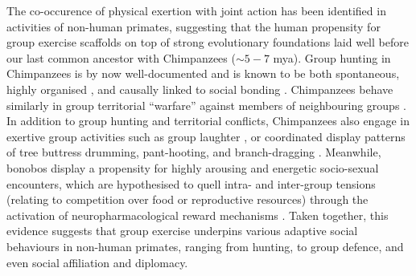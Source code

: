 \begin{CJK}{UTF8}{gbsn}
The co-occurence of physical exertion with joint action has been identified in activities of non-human primates, suggesting that the human propensity for group exercise scaffolds on top of strong evolutionary foundations laid well before our last common ancestor with Chimpanzees ($\sim 5-7$ mya).  Group hunting in Chimpanzees is by now well-documented and is known to be both spontaneous, highly organised \citep[for example involving divisions of set roles][]{Boesch1989}, and causally linked to social bonding \citep{Mitani2001}.  Chimpanzees behave similarly in group territorial ``warfare'' against members of neighbouring groups \citep{Boehm1992,Wilson2014a}.
In addition to group hunting and territorial conflicts, Chimpanzees also engage in exertive group activities such as group laughter \citep{Waller2005}, or coordinated display patterns of tree buttress drumming, pant-hooting, and branch-dragging \citep[for example, observed as part of a ``rain dance,'' see][]{Goodall2000,Whiten2001}.  Meanwhile, bonobos display a propensity for highly arousing and energetic socio-sexual encounters, which are hypothesised to quell intra- and inter-group tensions (relating to competition over food or reproductive resources) through the activation of neuropharmacological reward mechanisms \citep{Dunbar1992,Parr2005,Clay2015}.  Taken together, this evidence suggests that group exercise underpins various adaptive social behaviours in non-human primates, ranging from hunting, to group defence, and even social affiliation and diplomacy.


\end{CJK}
